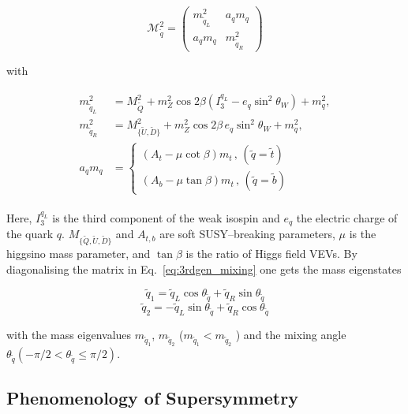 				\begin{equation}
				\label{eq:3rdgen_mixing}
					\mathcal {M}_{\tilde{q}}^2 = 
					\begin{pmatrix}
						m_{\tilde{q}_L}^2 & a_q m_q \\
						a_q m_q & m_{\tilde{q}_R}^2
					\end{pmatrix}
				\end{equation}

				\noindent with 

				\begin{align}
				\label{eq:msqL}
					\begin{split}
						m_{\tilde{q}_L}^2 & = M_{\tilde{Q}}^2 + m_Z^2 \cos 2\beta \left ( I_3^{q_L} - e_q \sin^2 \theta_W \right ) + m_q^2 ,
						\\ 
						m_{\tilde{q}_R}^2 & = M_{{\{ \tilde{U},\tilde{D} \}}}^2 + m_Z^2 \cos 2\beta\, e_q \sin^2 \theta_W  + m_q^2 , 
						\\
						a_q m_q & = 
						\begin{cases}
							\left ( A_t - \mu \cot \beta \right ) m_t\, , \, (\tilde{q} = \tilde{t}) \\  
							\left ( A_b - \mu \tan \beta \right ) m_t\, , \, (\tilde{q} = \tilde{b})  
						\end{cases}
					\end{split}
				\end{align}

				\noindent Here,  $I_3^{q_L}$ is the third component of the weak isospin and $e_q$ the electric charge of the quark $q$. $M_{{\{ \tilde{Q},\tilde{U},\tilde{D} \}}}$ and $A_{t,b}$ are soft SUSY–breaking parameters, $\mu$ is the higgsino mass parameter, and $\tan \beta$ is the ratio of Higgs field VEVs. By diagonalising the matrix in Eq.~\ref{eq:3rdgen_mixing} one gets the mass eigenstates 
				
				$$ \tilde{q}_1 = \tilde{q}_L \cos \theta_{\tilde{q}} + \tilde{q}_R \sin \theta_{\tilde{q}} $$
				$$ \tilde{q}_2 = - \tilde{q}_L \sin \theta_{\tilde{q}} + \tilde{q}_R \cos \theta_{\tilde{q}} $$
				
				\noindent with the mass eigenvalues $m_{\tilde{q}_1}$, $m_{\tilde{q}_2}$ ($m_{\tilde{q}_1} < m_{\tilde{q}_2}$ ) and the mixing angle $\theta_{\tilde{q}} \left (- \pi / 2 < \theta_{\tilde{q}} \leq \pi / 2 \right )$. 




		\subsection{Phenomenology of Supersymmetry}
		\label{sec:SUSYPheno}

